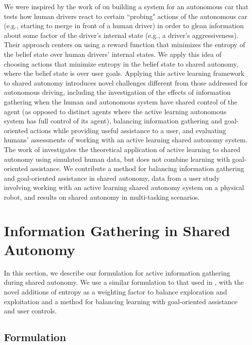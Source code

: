 \documentclass[conference]{IEEEtran}
\begin{document}
We were inspired by the work of \citet{sadigh2016information} on building a system for an autonomous car that tests how human drivers react to certain ``probing" actions of the autonomous car (e.g., starting to merge in front of a human driver) in order to glean information about some factor of the driver's internal state (e.g., a driver's aggressiveness). Their approach centers on using a reward function that minimizes the entropy of the belief state over human drivers' internal states. We apply this idea of choosing actions that minimize entropy in the belief state to shared autonomy, where the belief state is over user goals. Applying this active learning framework to shared autonomy introduces novel challenges different from those addressed for autonomous driving, including the investigation of the effects of information gathering when the human and autonomous system have shared control of the agent (as opposed to distinct agents where the active learning autonomous system has full control of its agent), balancing information gathering and goal-oriented actions while providing useful assistance to a user, and evaluating humans’ assessments of working with an active learning shared autonomy system. The work of \citet{landolfi2017exploring} investigates the theoretical application of active learning to shared autonomy using simulated human data, but does not combine learning with goal-oriented assistance. We contribute a method for balancing information gathering and goal-oriented assistance in shared autonomy, data from a user study involving working with an active learning shared autonomy system on a physical robot, and results on shared autonomy in multi-tasking scenarios.

\section{Information Gathering in Shared Autonomy}\label{formulation}

In this section, we describe our formulation for active information gathering during shared autonomy. We use a similar formulation to that used in \cite{sadigh2016information, sadigh2018planning}, with the novel additions of entropy as a weighting factor to balance exploration and exploitation and a method for balancing learning with goal-oriented assistance and user controls.

\subsection{Formulation}
\end{document}

